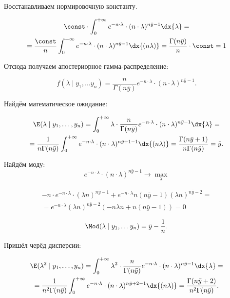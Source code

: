 \begin{problem}
\begin{sol}
Восстанавливаем нормировочную константу.

\begin{multline*}
\const \cdot \int_0^{+\infty} e^{-n \cdot \lambda} \cdot (n \cdot\lambda)^{n \bar y - 1} \dx{\lambda} =  \\ = \frac{\const}{n}  \int_0^{+\infty} e^{-n \cdot \lambda} \cdot (n \cdot\lambda)^{n \bar y - 1} \dx{(n \lambda)} = \frac{\Gamma(n \bar y)}{n} \cdot \const = 1
\end{multline*}

Отсюда получаем апостериорное гамма-распределение:

\[ f(\lambda \mid y_1, \ldots y_n) = \frac{n}{\Gamma(n\bar y)} e^{-n \cdot \lambda} \cdot (n \cdot\lambda)^{n \bar y - 1}. \]

Найдём математическое ожидание:

\begin{multline*}
\E(\lambda \mid y_1, \ldots, y_n) = \int_0^{+\infty} \lambda \cdot \frac{n}{\Gamma(n\bar y)} e^{-n \cdot \lambda} \cdot (n \cdot\lambda)^{n \bar y - 1} \dx{\lambda} = \\ = \frac{1}{n \Gamma(n\bar y)} \int_0^{+\infty} e^{-n \cdot \lambda} \cdot (n \cdot\lambda)^{n \bar y + 1 - 1} \dx{(n \lambda)} = \frac{\Gamma(n \bar{y} + 1)}{n \Gamma(n\bar y)} = \bar y.
\end{multline*}

Найдём моду:
\begin{equation*}
e^{-n \cdot \lambda} \cdot (n \cdot\lambda)^{n \bar y - 1}  \longrightarrow \max_{\lambda} 
\end{equation*}

\begin{multline*}
-n \cdot e^{-n \cdot \lambda} \cdot (\lambda n)^{n \bar y - 1} + e^{-n \cdot \lambda} n (n \bar y - 1)(\lambda n)^{n \bar y -2} = \\ = e^{-n \cdot \lambda} (\lambda n)^{n \bar y -2} ( -n \lambda n + n (n \bar y - 1)) = 0 
\end{multline*}

\begin{equation*}
\Mod(\lambda \mid y_1, \ldots y_n) = \bar y - \frac{1}{n}.
\end{equation*}

Пришёл черёд дисперсии:

\begin{multline*}
\E(\lambda^2 \mid y_1, \ldots, y_n) = \int_0^{+\infty} \lambda^2 \cdot \frac{n}{\Gamma(n\bar y)} e^{-n \cdot \lambda} \cdot (n \cdot\lambda)^{n \bar y - 1} \dx{\lambda} = \\ = \frac{1}{n^2 \Gamma(n\bar y)} \int_0^{+\infty} e^{-n \cdot \lambda} \cdot (n \cdot\lambda)^{n \bar y + 2 - 1} \dx{(n \lambda)} = \frac{\Gamma(n \bar{y} + 2)}{n^2 \Gamma(n\bar y)}.
\end{multline*}


\end{sol}
\end{problem}
